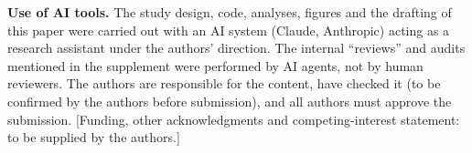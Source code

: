 \textbf{Use of AI tools.} The study design, code, analyses, figures and the drafting of this paper were carried out with an AI system (Claude, Anthropic) acting as a research assistant under the authors' direction. The internal ``reviews'' and audits mentioned in the supplement were performed by AI agents, not by human reviewers. The authors are responsible for the content, have checked it (to be confirmed by the authors before submission), and all authors must approve the submission. [Funding, other acknowledgments and competing-interest statement: to be supplied by the authors.]
